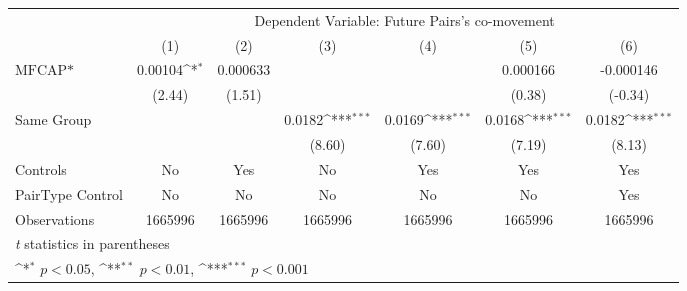 {
\def\sym#1{\ifmmode^{#1}\else\(^{#1}\)\fi}
\begin{tabular}{l*{6}{c}}
\hline\hline
                &\multicolumn{6}{c}{Dependent Variable: Future Pairs's co-movement}                                               \\\cmidrule(lr){2-7}
                &\multicolumn{1}{c}{(1)}         &\multicolumn{1}{c}{(2)}         &\multicolumn{1}{c}{(3)}         &\multicolumn{1}{c}{(4)}         &\multicolumn{1}{c}{(5)}         &\multicolumn{1}{c}{(6)}         \\
\hline
$ \text{MFCAP*} $&  0.00104\sym{*}  & 0.000633         &                  &                  & 0.000166         &-0.000146         \\
                &   (2.44)         &   (1.51)         &                  &                  &   (0.38)         &  (-0.34)         \\
[1em]
Same Group      &                  &                  &   0.0182\sym{***}&   0.0169\sym{***}&   0.0168\sym{***}&   0.0182\sym{***}\\
                &                  &                  &   (8.60)         &   (7.60)         &   (7.19)         &   (8.13)         \\
\hline
Controls        &       No         &      Yes         &       No         &      Yes         &      Yes         &      Yes         \\
PairType Control&       No         &       No         &       No         &       No         &       No         &      Yes         \\
Observations    &  1665996         &  1665996         &  1665996         &  1665996         &  1665996         &  1665996         \\
\hline\hline
\multicolumn{7}{l}{\footnotesize \textit{t} statistics in parentheses}\\
\multicolumn{7}{l}{\footnotesize \sym{*} \(p<0.05\), \sym{**} \(p<0.01\), \sym{***} \(p<0.001\)}\\
\end{tabular}
}
